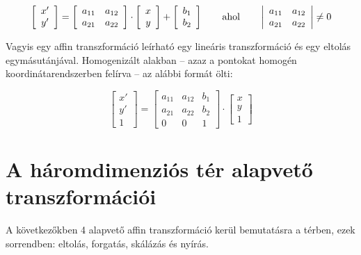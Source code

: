 \[\left[\begin{array}{c}x' \\y'\end{array}\right] = \left[\begin{array}{cc}a_{11} & a_{12}\\a_{21} & a_{22}\\\end{array}\right] \cdot \left[\begin{array}{c}x \\y\end{array}\right] + \left[\begin{array}{c}b_1 \\b_2\end{array}\right] \qquad \hbox{ahol} \qquad  \left|\begin{array}{cc}a_{11} & a_{12}\\a_{21} & a_{22}\\\end{array}\right| \neq 0\]

Vagyis egy affin transzformáció leírható egy lineáris transzformáció és egy eltolás egymásutánjával. Homogenizált alakban -- azaz a pontokat homogén koordinátarendszerben felírva -- az alábbi formát ölti:

\[\left[\begin{array}{c}x' \\y'\\ 1\end{array}\right] = \left[\begin{array}{ccc}a_{11} & a_{12} & b_1\\a_{21} & a_{22} & b_2\\0 & 0 & 1\end{array}\right] \cdot \left[\begin{array}{c}x \\ y\\ 1\end{array}\right]\]

\section{A háromdimenziós tér alapvető transzformációi}

A következőkben 4 alapvető affin transzformáció kerül bemutatásra a térben, ezek sorrendben: eltolás, forgatás, skálázás és nyírás.

